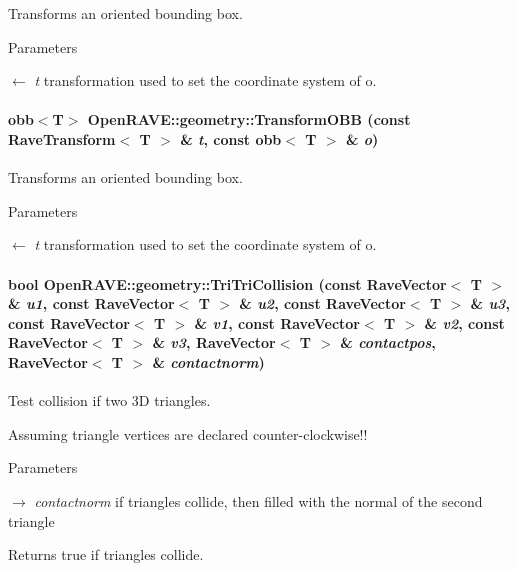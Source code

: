 Transforms an oriented bounding box. 


\begin{DoxyParams}{Parameters}
\item[\mbox{$\leftarrow$} {\em t}]transformation used to set the coordinate system of o. \end{DoxyParams}
\hypertarget{group__geometric__primitives_ga94bf61739c3a0110d5230da07bde8b37}{
\paragraph[{TransformOBB}]{\setlength{\rightskip}{0pt plus 5cm}obb$<$T$>$ OpenRAVE::geometry::TransformOBB (const RaveTransform$<$ T $>$ \& {\em t}, \/  const obb$<$ T $>$ \& {\em o})}\hfill}
\label{group__geometric__primitives_ga94bf61739c3a0110d5230da07bde8b37}


Transforms an oriented bounding box. 


\begin{DoxyParams}{Parameters}
\item[\mbox{$\leftarrow$} {\em t}]transformation used to set the coordinate system of o. \end{DoxyParams}
\hypertarget{group__geometric__primitives_ga07425830ea25e001f8682da7f2504875}{
\paragraph[{TriTriCollision}]{\setlength{\rightskip}{0pt plus 5cm}bool OpenRAVE::geometry::TriTriCollision (const RaveVector$<$ T $>$ \& {\em u1}, \/  const RaveVector$<$ T $>$ \& {\em u2}, \/  const RaveVector$<$ T $>$ \& {\em u3}, \/  const RaveVector$<$ T $>$ \& {\em v1}, \/  const RaveVector$<$ T $>$ \& {\em v2}, \/  const RaveVector$<$ T $>$ \& {\em v3}, \/  RaveVector$<$ T $>$ \& {\em contactpos}, \/  RaveVector$<$ T $>$ \& {\em contactnorm})}\hfill}
\label{group__geometric__primitives_ga07425830ea25e001f8682da7f2504875}


Test collision if two 3D triangles.

Assuming triangle vertices are declared counter-\/clockwise!! 


\begin{DoxyParams}{Parameters}
\item[\mbox{$\rightarrow$} {\em contactnorm}]if triangles collide, then filled with the normal of the second triangle \end{DoxyParams}
\begin{DoxyReturn}{Returns}
true if triangles collide. 
\end{DoxyReturn}
